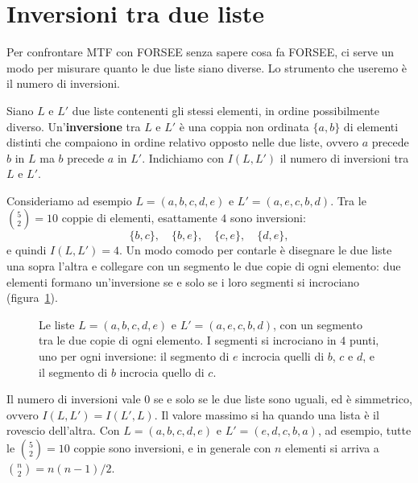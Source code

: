 \section{Inversioni tra due liste}\label{sec:inversioni}
Per confrontare MTF con FORSEE senza sapere cosa fa FORSEE, ci serve un modo per misurare quanto le due liste siano diverse. Lo strumento che useremo è il numero di inversioni.

\begin{definizione}[Inversione]\label{def:inversione}
Siano $L$ e $L'$ due liste contenenti gli stessi elementi, in ordine possibilmente diverso. Un'\textbf{inversione} tra $L$ e $L'$ è una coppia non ordinata $\{a, b\}$ di elementi distinti che compaiono in ordine relativo opposto nelle due liste, ovvero $a$ precede $b$ in $L$ ma $b$ precede $a$ in $L'$. Indichiamo con $I(L, L')$ il numero di inversioni tra $L$ e $L'$.
\end{definizione}

Consideriamo ad esempio $L = (a, b, c, d, e)$ e $L' = (a, e, c, b, d)$. Tra le $\binom{5}{2} = 10$ coppie di elementi, esattamente $4$ sono inversioni:
\[
\{b, c\}, \quad \{b, e\}, \quad \{c, e\}, \quad \{d, e\},
\]
e quindi $I(L, L') = 4$. Un modo comodo per contarle è disegnare le due liste una sopra l'altra e collegare con un segmento le due copie di ogni elemento: due elementi formano un'inversione se e solo se i loro segmenti si incrociano (figura~\ref{fig:inversioni}).

\begin{figure}[htbp]
\centering
{}
\caption{Le liste $L = (a, b, c, d, e)$ e $L' = (a, e, c, b, d)$, con un segmento tra le due copie di ogni elemento. I segmenti si incrociano in $4$ punti, uno per ogni inversione: il segmento di $e$ incrocia quelli di $b$, $c$ e $d$, e il segmento di $b$ incrocia quello di $c$.}
\label{fig:inversioni}
\end{figure}

Il numero di inversioni vale $0$ se e solo se le due liste sono uguali, ed è simmetrico, ovvero $I(L, L') = I(L', L)$. Il valore massimo si ha quando una lista è il rovescio dell'altra. Con $L = (a, b, c, d, e)$ e $L' = (e, d, c, b, a)$, ad esempio, tutte le $\binom{5}{2} = 10$ coppie sono inversioni, e in generale con $n$ elementi si arriva a $\binom{n}{2} = n(n-1)/2$.

